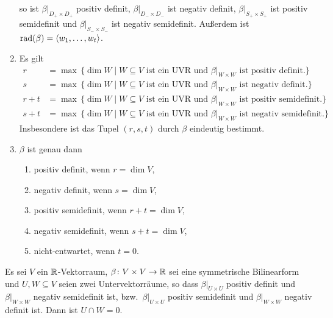\begin{corollary}
\begin{enumerate}[leftmargin=*, label=\roman*)]
      so ist $\beta|_{D_+ \times D_+}$ positiv definit, $\beta|_{D_- \times D_-}$ ist negativ definit, $\beta|_{S_+ \times S_+}$ ist positiv semidefinit und $\beta|_{S_- \times S_-}$ ist negativ semidefinit.
      Außerdem ist $\operatorname{rad}(\beta) = \left\langle w_1, \dotsc, w_t \right\rangle$.
    \item
      Es gilt
      \begin{align*}
        r
        &=
        \max\,
        \{
          \dim W
          \mid
          \text{$W \subseteq V$ ist ein UVR und $\beta|_{W \times W}$ ist positiv definit}.
        \}
        \\
        s
        &=
        \max\,
        \{
          \dim W
          \mid
          \text{$W \subseteq V$ ist ein UVR und $\beta|_{W \times W}$ ist negativ definit}.
        \}
        \\
        r+t
        &=
        \max\,
        \{
          \dim W
          \mid
          \text{$W \subseteq V$ ist ein UVR und $\beta|_{W \times W}$ ist positiv semidefinit}.
        \}
        \\
        s+t
        &=
        \max\,
        \{
          \dim W
          \mid
          \text{$W \subseteq V$ ist ein UVR und $\beta|_{W \times W}$ ist negativ semidefinit}.
        \}
      \end{align*}
      Insbesondere ist das Tupel $(r,s,t)$ durch $\beta$ eindeutig bestimmt.
    \item
      $\beta$ ist genau dann
      \begin{enumerate}[leftmargin=*, label=\alph*)]
        \item
          positiv definit, wenn $r = \dim V$,
        \item
          negativ definit, wenn $s = \dim V$,
        \item
          positiv semidefinit, wenn $r + t = \dim V$,
        \item
          negativ semidefinit, wenn $s + t = \dim V$,
        \item
          nicht-entwartet, wenn $t = 0$.
      \end{enumerate}
  \end{enumerate}
\end{corollary}


\begin{lemma}
  Es sei $V$ ein $\mathbb{R}$-Vektorraum, $\beta \colon V \times V \to \mathbb{R}$ sei eine symmetrische Bilinearform und $U, W \subseteq V$ seien zwei Untervektorräume, so dass $\beta|_{U \times U}$ positiv definit und $\beta|_{W \times W}$ negativ semidefinit ist, bzw.\ $\beta|_{U \times U}$ positiv semidefinit und $\beta|_{W \times W}$ negativ definit ist.
  Dann ist $U \cap W = 0$.
\end{lemma}


